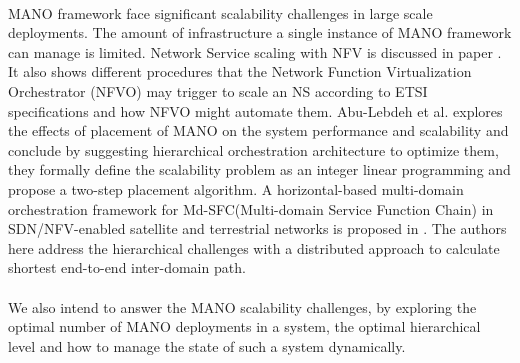 \paragraph{}
MANO framework face significant scalability challenges in large scale deployments. The amount of infrastructure a single instance of MANO framework can manage is limited. Network Service scaling with NFV is discussed in paper \cite{adamuz2018automated}. It also shows different procedures that the Network Function Virtualization Orchestrator (NFVO) may trigger to scale an NS according to ETSI specifications and how NFVO might automate them. Abu-Lebdeh et al. \cite{abu-lebdeh_nfv_2017} explores the effects of placement of MANO on the system performance and scalability and conclude by suggesting hierarchical orchestration architecture to optimize them, they formally define the scalability problem as an integer linear programming and propose a two-step placement algorithm. 
A horizontal-based multi-domain orchestration framework for  Md-SFC(Multi-domain Service Function Chain) in SDN/NFV-enabled satellite and terrestrial networks is proposed in \cite{li_horizontal-based_2018}. The authors here address the hierarchical challenges with a distributed approach to calculate shortest end-to-end inter-domain path.  
\paragraph{}
We also intend to answer the MANO scalability challenges, by exploring the optimal number of MANO deployments in a system, the optimal hierarchical level and how to manage the state of such a system dynamically.
